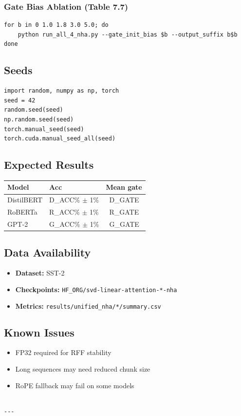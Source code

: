 \subsubsection{Gate Bias Ablation (Table 7.7)}
\begin{lstlisting}
for b in 0 1.0 1.8 3.0 5.0; do
    python run_all_4_nha.py --gate_init_bias $b --output_suffix b$b
done
\end{lstlisting}

\subsection{Seeds}

\begin{lstlisting}
import random, numpy as np, torch
seed = 42
random.seed(seed)
np.random.seed(seed)
torch.manual_seed(seed)
torch.cuda.manual_seed_all(seed)
\end{lstlisting}

\subsection{Expected Results}

\begin{table}[H]
\centering
\small
\begin{tabular}{lll}
\toprule
\textbf{Model} & \textbf{Acc} & \textbf{Mean gate} \\
\midrule
DistilBERT & {{D\_ACC}}\% $\pm$ 1\% & ~{{D\_GATE}} \\
RoBERTa & {{R\_ACC}}\% $\pm$ 1\% & ~{{R\_GATE}} \\
GPT-2 & {{G\_ACC}}\% $\pm$ 1\% & ~{{G\_GATE}} \\
\bottomrule
\end{tabular}
\end{table}

\subsection{Data Availability}

\begin{itemize}
\item \textbf{Dataset:} SST-2
\item \textbf{Checkpoints:} \texttt{{{HF\_ORG}}/svd-linear-attention-*-nha}
\item \textbf{Metrics:} \texttt{results/unified\_nha/*/summary.csv}

\end{itemize}
\subsection{Known Issues}

\begin{itemize}
\item FP32 required for RFF stability
\item Long sequences may need reduced chunk size
\item RoPE fallback may fail on some models
\end{itemize}
\begin{lstlisting}

---
\end{lstlisting}